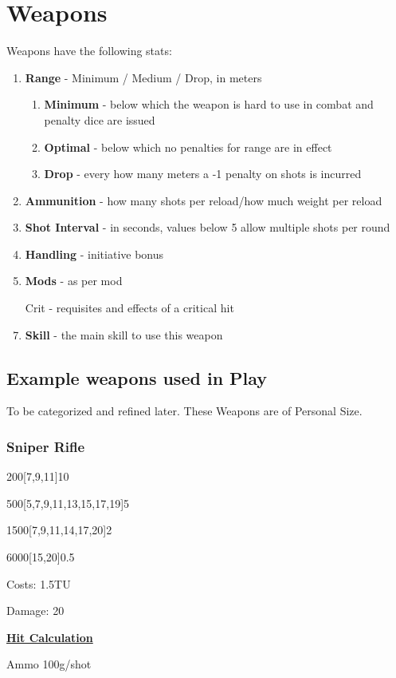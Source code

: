 \section{Weapons}\label{sec:weapons}

Weapons have the following stats:
\begin{enumerate}
    \item \textbf{Range} - Minimum / Medium / Drop, in meters
        \begin{enumerate}
            \item \textbf{Minimum} - below which the weapon is hard to use in combat and penalty dice are issued
            \item \textbf{Optimal} - below which no penalties for range are in effect
            \item \textbf{Drop} - every how many meters a -1 penalty on shots is incurred
        \end{enumerate}
    \item \textbf{Ammunition} - how many shots per reload/how much weight per reload
    \item \textbf{Shot Interval} - in seconds,  values below 5 allow multiple shots per round
    \item \textbf{Handling} - initiative bonus
    \item \textbf{Mods} - as per mod
    \item[Crit] - requisites and effects of a critical hit
    \item \textbf{Skill} - the main skill to use this weapon
\end{enumerate}

\subsection{Example weapons used in Play}\label{subsec:example-weapons-used-in-play}
To be categorized and refined later.
These Weapons are of Personal Size.
\subsubsection{Sniper Rifle}
200[7,9,11]10\par
500[5,7,9,11,13,15,17,19]5\par
1500[7,9,11,14,17,20]2\par
6000[15,20]0.5\par
Costs: 1.5TU\par
Damage: 20\par
\hyperref[subsec:hit]{\textbf{Hit Calculation}} \par
[0,80,100,150]
Ammo 100g/shot

